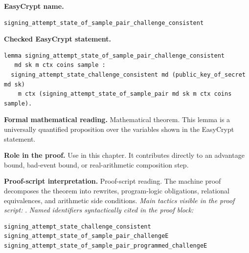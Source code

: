 \begin{formaltheorem}
\noindent\textbf{EasyCrypt name.}
\begin{lstlisting}[language=EasyCrypt,basicstyle=\ttfamily\scriptsize]
signing_attempt_state_of_sample_pair_challenge_consistent
\end{lstlisting}
\noindent\textbf{Checked EasyCrypt statement.}
\begin{lstlisting}[language=EasyCrypt,basicstyle=\ttfamily\scriptsize]
lemma signing_attempt_state_of_sample_pair_challenge_consistent
   md sk m ctx coins sample :
  signing_attempt_state_challenge_consistent md (public_key_of_secret md sk)
    m ctx (signing_attempt_state_of_sample_pair md sk m ctx coins sample).
\end{lstlisting}
\noindent\textbf{Formal mathematical reading.}
Mathematical theorem. This lemma is a universally quantified proposition over the variables shown in the EasyCrypt statement.

\noindent\textbf{Role in the proof.}
Use in this chapter. It contributes directly to an advantage bound, bad-event bound, or real-arithmetic composition step.

\noindent\textbf{Proof-script interpretation.}
Proof-script reading. The machine proof decomposes the theorem into rewrites, program-logic obligations, relational equivalences, and arithmetic side conditions.
\emph{Main tactics visible in the proof script:} .
\emph{Named identifiers syntactically cited in the proof block:}
\begin{lstlisting}[language=EasyCrypt,basicstyle=\ttfamily\scriptsize]
signing_attempt_state_challenge_consistent
signing_attempt_state_of_sample_pair_challengeE
signing_attempt_state_of_sample_pair_programmed_challengeE
\end{lstlisting}

\end{formaltheorem}


